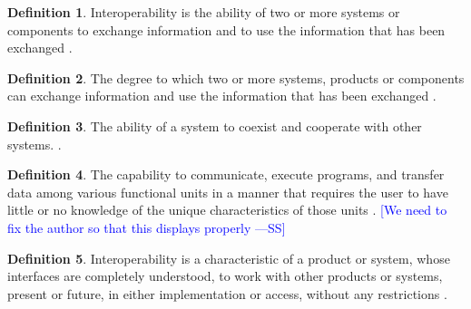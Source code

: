 \documentclass[letterpaper,cleveref]{lipics-v2019}
\newcommand{\authornote}[3]{\textcolor{#1}{[#3 ---#2]}}
\newcommand{\authornote}[3]{}
\newcommand{\wss}[1]{\authornote{blue}{SS}{#1}} %
\theoremstyle{definition}
\newtheorem{defn}{Definition}
\begin{document}
\begin{defn}
Interoperability is the ability of two or more systems or components to exchange
information and to use the information that has been exchanged
\citep{IEEEComputerDictionary1991}.
\end{defn}
\begin{defn}
\label{InteroperabilitySelected}
The degree to which two or more systems, products or components can exchange
information and use the information that has been exchanged
\citep{ISO/IEC25010}.
\end{defn}
\begin{defn}
The ability of a system to coexist and cooperate with other systems.
\citep{ghezzi1991fundamentals}.
\end{defn}
\begin{defn}
The capability to communicate, execute programs, and transfer data among various
functional units in a manner that requires the user to have little or no
knowledge of the unique characteristics of those units
\citep{ISO/IEC/IEEE24765}. \wss{We need to fix the author so that this displays properly}
\end{defn}
\begin{defn}Interoperability is a characteristic of a product or system, whose
interfaces are completely understood, to work with other products or systems,
present or future, in either implementation or access, without any restrictions
\citep{AFUL2019}.
\end{defn}
\end{document}
